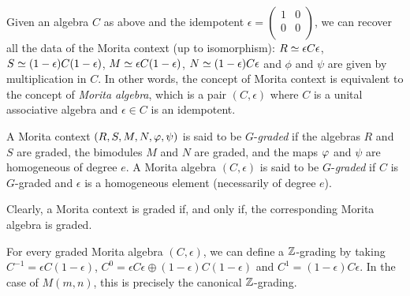 Given an algebra $C$ as above and the idempotent 
$
\epsilon = \left(\begin{matrix}
1  &  0\\
0   &  0\\
\end{matrix}
\right)
$, 
we can recover all the data of the Morita context (up to isomorphism): $R \simeq \epsilon C \epsilon$, $S \simeq (1 - \epsilon) C (1 - \epsilon)$, $M \simeq \epsilon C (1-\epsilon)$, $N \simeq (1-\epsilon) C \epsilon$ and $\phi$ and $\psi$ are given by multiplication in $C$. In other words, the concept of Morita context is equivalent to the concept of \emph{Morita algebra}, which is a pair $(C,\epsilon)$ where $C$ is a unital associative algebra and $\epsilon\in C$ is an idempotent. 

\begin{defi}
	A Morita context $(R, S, M, N, \varphi, \psi )$ is said to be $G$-\emph{graded} if the algebras $R$ and $S$ are graded, the bimodules $M$ and $N$ are graded, and the maps $\varphi$ and $\psi$ are homogeneous of degree $e$. A Morita algebra $(C,\epsilon)$ is said to be $G$-\emph{graded} if $C$ is $G$-graded and $\epsilon$ is a homogeneous element (necessarily of degree $e$).
\end{defi}

Clearly, a Morita context is graded if, and only if, the corresponding Morita algebra is graded.

\begin{remark}\label{remarkk}
For every graded Morita algebra $(C,\epsilon)$, we can define a $\mathbb{Z}$-grading by taking $C^{-1} = \epsilon C (1-\epsilon )$, $C^0 = \epsilon C \epsilon \oplus (1-\epsilon)C(1-\epsilon)$ and $C^1=(1-\epsilon)C\epsilon$. In the case of $M(m,n)$, this is precisely the canonical $\mathbb{Z}$-grading.
\end{remark}

